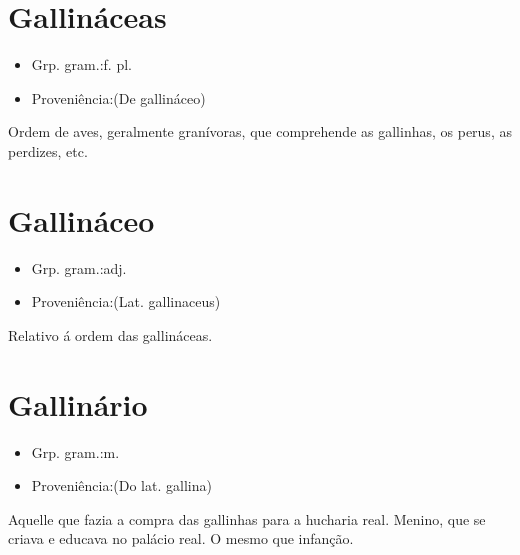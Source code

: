 \section{Gallináceas}
\begin{itemize}
\item {Grp. gram.:f. pl.}
\end{itemize}
\begin{itemize}
\item {Proveniência:(De \textunderscore gallináceo\textunderscore )}
\end{itemize}
Ordem de aves, geralmente granívoras, que comprehende as gallinhas, os perus, as perdizes, etc.
\section{Gallináceo}
\begin{itemize}
\item {Grp. gram.:adj.}
\end{itemize}
\begin{itemize}
\item {Proveniência:(Lat. \textunderscore gallinaceus\textunderscore )}
\end{itemize}
Relativo á ordem das gallináceas.
\section{Gallinário}
\begin{itemize}
\item {Grp. gram.:m.}
\end{itemize}
\begin{itemize}
\item {Proveniência:(Do lat. \textunderscore gallina\textunderscore )}
\end{itemize}
Aquelle que fazia a compra das gallinhas para a hucharia real.
Menino, que se criava e educava no palácio real.
O mesmo que \textunderscore infanção\textunderscore .
